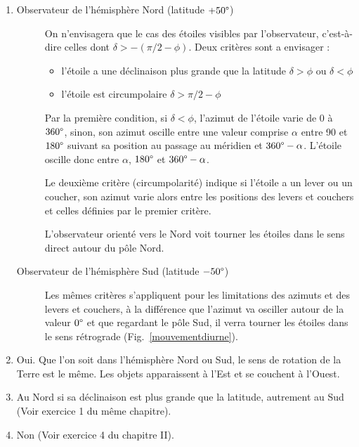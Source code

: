 \documentclass[a4paper,10pt]{report}
\renewcommand{\deg}{\ensuremath{\degree}}
\begin{document}
\begin{Answer}
  \begin{enumerate}
  \item
    \begin{description}
    \item[Observateur de l'hémisphère Nord (latitude $+50\deg$)] On
      n'envisagera que le cas des étoiles visibles par l'observateur,
      c'est-à-dire celles dont $\delta > -(\pi/2 - \phi)$. Deux
      critères sont a envisager :
      \begin{itemize}
      \item l'étoile a une déclinaison plus grande que la latitude
        $\delta>\phi$ ou $\delta<\phi$
      \item l'étoile est circumpolaire $\delta > \pi/2 - \phi$
      \end{itemize}
      Par la première condition, si $\delta<\phi$, l'azimut de
      l'étoile varie de 0 à $360\deg$, sinon, son azimut oscille
      entre une valeur comprise $\alpha$ entre 90 et $180\deg$
      suivant sa position au passage au méridien et
      $360\deg-\alpha$. L'étoile oscille donc entre $\alpha$,
      $180\deg$ et $360\deg-\alpha$.

      Le deuxième critère (circumpolarité) indique si l'étoile a un
      lever ou un coucher, son azimut varie alors entre les positions
      des levers et couchers et celles définies par le premier
      critère.

      L'observateur orienté vers le Nord voit tourner les étoiles dans
      le sens direct autour du pôle Nord.

    \item[Observateur de l'hémisphère Sud (latitude $-50\deg$)] Les
      mêmes critères s'appliquent pour les limitations des azimuts et
      des levers et couchers, à la différence que l'azimut va osciller
      autour de la valeur $0\deg$ et que regardant le pôle Sud, il
      verra tourner les étoiles dans le sens rétrograde
      (Fig.~\ref{mouvementdiurne}).
    \end{description}
  \item Oui. Que l'on soit dans l'hémisphère Nord ou Sud, le sens de
    rotation de la Terre est le même. Les objets apparaissent à l'Est
    et se couchent à l'Ouest.

  \item Au Nord si sa déclinaison est plus grande que la latitude,
    autrement au Sud (Voir exercice 1 du même chapitre).

  \item Non (Voir exercice 4 du chapitre II).
  \end{enumerate}
\end{Answer}
\end{document}
